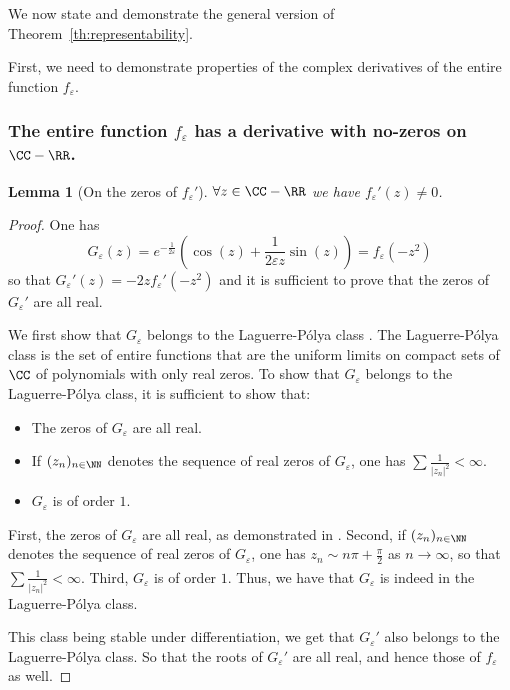 \documentclass{article}
\newtheorem{lemma}{Lemma}
\begin{document}
We now state and demonstrate the general version of Theorem~\ref{th:representability}.

First, we need to demonstrate properties of the complex derivatives of the entire function $f_{\varepsilon}$.

\subsubsection{The entire function $f_{\varepsilon}$ has a derivative with no-zeros on $\CC-\RR$.}

\begin{lemma}[On the zeros of $f_{\varepsilon}'$]\label{lemma:zeros_derivative}
$\forall z \in \CC-\RR$ we have $f_{\varepsilon}'(z) \neq 0$.
\end{lemma}

\begin{proof}
One has $$G_{\varepsilon}(z) =  e^{-\frac{1}{2 \varepsilon}}(\cos(z) + \frac{1}{2\varepsilon z} \sin(z)) = f_{\varepsilon}(-z^2)$$
so that $G_{\varepsilon}'(z) = -2zf_{\varepsilon}'(-z^2)$ and it is sufficient to prove that the zeros of $G_{\varepsilon}'$ are all real. 

We first show that $G_{\varepsilon}$ belongs to the Laguerre-Pólya class \cite{craven2002iterated}. The Laguerre-Pólya class is the set of entire functions that are the uniform limits on compact sets of $\CC$ of polynomials with only real zeros. To show that $G_{\varepsilon}$ belongs to the Laguerre-Pólya class, it is sufficient to show \citep[p. 22]{dryanov1999approximation} that:
\begin{itemize}
    \item The zeros of $G_{\varepsilon}$ are all real.
    \item If $(z_n)_{n \in \NN}$ denotes the sequence of real zeros of $G_{\varepsilon}$, one has $\sum \frac{1}{|z_n|^2} < \infty$.
    \item $G_{\varepsilon}$ is of order $1$.
\end{itemize}
First, the zeros of $G_{\varepsilon}$ are all real, as demonstrated in \citet{runckel1969zeros}. Second, if $(z_n)_{n \in \NN}$ denotes the sequence of real zeros of $G_{\varepsilon}$, one has $z_n \sim n \pi + \frac{\pi}{2}$ as $n\xrightarrow[]{} \infty$, so that $\sum \frac{1}{|z_n|^2} < \infty$. Third, $G_{\varepsilon}$ is of order $1$.
Thus, we have that $G_{\varepsilon}$ is indeed in the Laguerre-Pólya class.

This class being stable under differentiation, we get that $G_{\varepsilon}'$ also belongs to the Laguerre-Pólya class. So that the roots of $G_{\varepsilon}'$ are all real, and hence those of $f_{\varepsilon}$ as well.

\end{proof}
\end{document}
